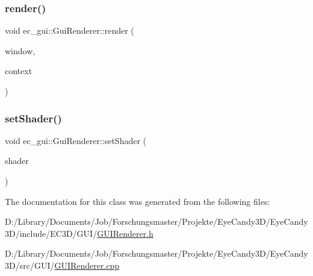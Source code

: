 \mbox{\label{classec__gui_1_1_gui_renderer_a6f40e38fdaa3c580322009dcf4ae84ed}} 
\subsubsection{\texorpdfstring{render()}{render()}\hspace{0.1cm}{\footnotesize\ttfamily [5/5]}}
{\footnotesize\ttfamily void ec\+\_\+gui\+::\+Gui\+Renderer\+::render (\begin{DoxyParamCaption}\item[{\mbox{\hyperlink{classec__gui_1_1_window}{Window}} $\ast$}]{window,  }\item[{\mbox{\hyperlink{classec__gui_1_1_gui_rendering_context}{Gui\+Rendering\+Context}} \&}]{context }\end{DoxyParamCaption})}

\mbox{\label{classec__gui_1_1_gui_renderer_a01fd73fc0e9ff5eb801412b8f83dad9b}} 
\subsubsection{\texorpdfstring{set\+Shader()}{setShader()}}
{\footnotesize\ttfamily void ec\+\_\+gui\+::\+Gui\+Renderer\+::set\+Shader (\begin{DoxyParamCaption}\item[{\mbox{\hyperlink{classec_1_1_shader}{ec\+::\+Shader}} $\ast$}]{shader }\end{DoxyParamCaption})}



The documentation for this class was generated from the following files\+:\begin{DoxyCompactItemize}
\item 
D\+:/\+Library/\+Documents/\+Job/\+Forschungsmaster/\+Projekte/\+Eye\+Candy3\+D/\+Eye\+Candy3\+D/include/\+E\+C3\+D/\+G\+U\+I/\mbox{\hyperlink{_g_u_i_renderer_8h}{G\+U\+I\+Renderer.\+h}}\item 
D\+:/\+Library/\+Documents/\+Job/\+Forschungsmaster/\+Projekte/\+Eye\+Candy3\+D/\+Eye\+Candy3\+D/src/\+G\+U\+I/\mbox{\hyperlink{_g_u_i_renderer_8cpp}{G\+U\+I\+Renderer.\+cpp}}\end{DoxyCompactItemize}
